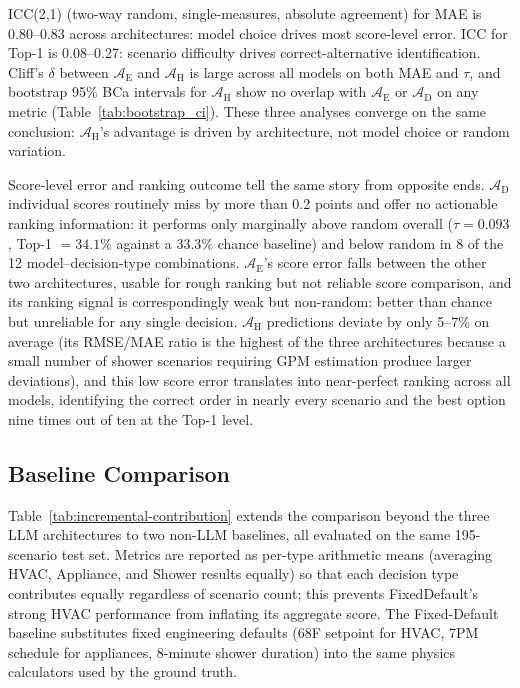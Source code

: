 \documentclass[final,3p,times]{elsarticle}
\begin{document}
ICC(2,1) (two-way random, single-measures, absolute agreement) for MAE is 0.80--0.83 across architectures: model choice drives most score-level error. ICC for Top-1 is 0.08--0.27: scenario difficulty drives correct-alternative identification. Cliff's $\delta$ between $\mathcal{A}_{\text{E}}$ and $\mathcal{A}_{\text{H}}$ is large across all models on both MAE and $\tau$, and bootstrap 95\% BCa intervals for $\mathcal{A}_{\text{H}}$ show no overlap with $\mathcal{A}_{\text{E}}$ or $\mathcal{A}_{\text{D}}$ on any metric (Table~\ref{tab:bootstrap_ci}). These three analyses converge on the same conclusion: $\mathcal{A}_{\text{H}}$'s advantage is driven by architecture, not model choice or random variation.

Score-level error and ranking outcome tell the same story from opposite ends. $\mathcal{A}_{\text{D}}$ individual scores routinely miss by more than 0.2 points and offer no actionable ranking information: it performs only marginally above random overall ($\tau = 0.093$, Top-1 $= 34.1\%$ against a $33.3\%$ chance baseline) and below random in 8 of the 12 model--decision-type combinations. $\mathcal{A}_{\text{E}}$'s score error falls between the other two architectures, usable for rough ranking but not reliable score comparison, and its ranking signal is correspondingly weak but non-random: better than chance but unreliable for any single decision. $\mathcal{A}_{\text{H}}$ predictions deviate by only 5--7\% on average (its RMSE/MAE ratio is the highest of the three architectures because a small number of shower scenarios requiring GPM estimation produce larger deviations), and this low score error translates into near-perfect ranking across all models, identifying the correct order in nearly every scenario and the best option nine times out of ten at the Top-1 level.

\FloatBarrier
\subsection{Baseline Comparison}
\label{sec:res-baselines}
Table~\ref{tab:incremental-contribution} extends the comparison beyond the three LLM architectures to two non-LLM baselines, all evaluated on the same 195-scenario test set. Metrics are reported as per-type arithmetic means (averaging HVAC, Appliance, and Shower results equally) so that each decision type contributes equally regardless of scenario count; this prevents FixedDefault's strong HVAC performance from inflating its aggregate score. The Fixed-Default baseline substitutes fixed engineering defaults (68\textdegree{}F setpoint for HVAC, 7PM schedule for appliances, 8-minute shower duration) into the same physics calculators used by the ground truth.
\end{document}
